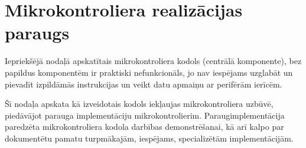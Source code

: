 \section{Mikrokontroliera realizācijas paraugs} \label{sec:uC}
	Iepriekšējā nodaļā apskatītais mikrokontroliera kodols (centrālā
	komponente), bez papildus komponentēm ir praktiski nefunkcionāls, jo
	nav iespējams uzglabāt un pievadīt izpildāmās instrukcijas un veikt
	datu apmaiņu ar perifērām ierīcēm.
	
	
	Šī nodaļa apskata kā izveidotais kodols iekļaujas
	mikrokontroliera uzbūvē, piedāvājot	parauga implementāciju
	mikrokontrolierim. 
	Paraug\-implementācija paredzēta mikrokontroliera kodola 
	darbības demonstrēšanai, kā arī kalpo par dokumentētu pamatu 
	turpmākajām, iespējams, specializētām implementācijām.
	
	
	 \pagebreak[3]
	
